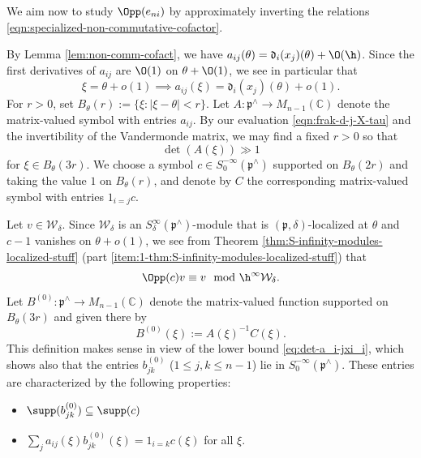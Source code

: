 We aim now to study $\Opp(e_{n i})$ by approximately inverting the relations \eqref{eqn:specialized-non-commutative-cofactor}.

By Lemma \ref{lem:non-comm-cofact}, we have $a_{i j}(\theta) = \mathfrak{d}_i(x_j)(\theta) + \O(\h)$.  Since the first derivatives of $a_{i j}$ are $\O(1)$ on $\theta + \O(1)$, we see in particular that
\[
  \xi = \theta + o(1) \implies a_{i j}(\xi) = \mathfrak{d}_i(x_j)(\theta) + o(1).
\]
For $r > 0$, set $B_\theta(r) := \{\xi : |\xi - \theta| < r\}$.
Let $A : \mathfrak{p}^\wedge \rightarrow M_{n - 1}(\mathbb{C})$ denote the matrix-valued symbol with entries $a_{i j}$.  By our evaluation \eqref{eqn:frak-d-j-X-tau} and the invertibility of the Vandermonde matrix, we may find a fixed $r > 0$ so that
\begin{equation}\label{eq:det-a_i-jxi_i}
  \det( A(\xi)) \gg 1
\end{equation}
for $\xi \in B_\theta(3 r)$.  We choose a symbol $c \in S^{-\infty}_0(\mathfrak{p}^\wedge)$ supported on $B_\theta(2 r)$ and taking the value $1$ on $B_\theta(r)$, and denote by $C$ the corresponding matrix-valued symbol with entries $1_{i=j} c$.

Let $v \in \mathcal{W}_\delta$.  Since $\mathcal{W}_\delta$ is an $S^\infty_\delta(\mathfrak{p}^\wedge)$-module that is $(\mathfrak{p},\delta)$-localized at $\theta$ and $c-1$ vanishes on $\theta + o(1)$, we see from Theorem \ref{thm:S-infinity-modules-localized-stuff} (part \eqref{item:1-thm:S-infinity-modules-localized-stuff}) that
\begin{equation*}%
  \Opp(c) v \equiv v \mod{\h^\infty
    \mathcal{W}_\delta}.
\end{equation*}
Let $B^{(0)} : \mathfrak{p}^\wedge \rightarrow M_{n - 1}(\mathbb{C})$ denote the matrix-valued function supported on $B_\theta(3 r)$ and given there by
\begin{equation*}
  B^{(0)}(\xi) := A(\xi)^{-1} C(\xi).
\end{equation*}
This definition makes sense in view of the lower bound \eqref{eq:det-a_i-jxi_i}, which shows also that the entries $b_{j k}^{(0)}$ ($1 \leq j,k \leq n-1$) lie in $S^{-\infty}_0(\mathfrak{p}^\wedge)$.  These entries are characterized by the following properties:
\begin{itemize}
\item $\supp(b_{j k}^{(0)}) \subseteq \supp(c)$
\item $\sum_j a_{i j}(\xi) b_{j k}^{(0)}(\xi) = 1_{i=k} c(\xi)$ for all $\xi$.
\end{itemize}

